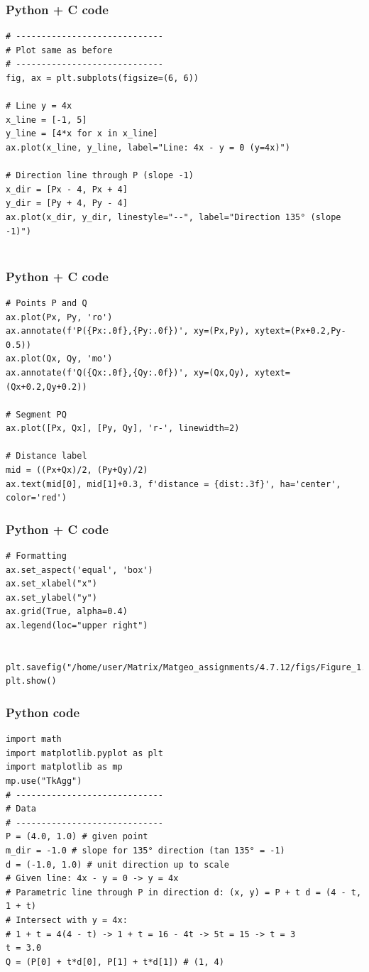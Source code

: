 \documentclass{beamer}
\begin{document}
\begin{frame}[fragile]
    \frametitle{Python + C code}

    \begin{lstlisting}
# -----------------------------
# Plot same as before
# -----------------------------
fig, ax = plt.subplots(figsize=(6, 6))

# Line y = 4x
x_line = [-1, 5]
y_line = [4*x for x in x_line]
ax.plot(x_line, y_line, label="Line: 4x - y = 0 (y=4x)")

# Direction line through P (slope -1)
x_dir = [Px - 4, Px + 4]
y_dir = [Py + 4, Py - 4]
ax.plot(x_dir, y_dir, linestyle="--", label="Direction 135° (slope -1)")


    \end{lstlisting}
\end{frame}

\begin{frame}[fragile]
    \frametitle{Python + C code}

    \begin{lstlisting}
# Points P and Q
ax.plot(Px, Py, 'ro')
ax.annotate(f'P({Px:.0f},{Py:.0f})', xy=(Px,Py), xytext=(Px+0.2,Py-0.5))
ax.plot(Qx, Qy, 'mo')
ax.annotate(f'Q({Qx:.0f},{Qy:.0f})', xy=(Qx,Qy), xytext=(Qx+0.2,Qy+0.2))

# Segment PQ
ax.plot([Px, Qx], [Py, Qy], 'r-', linewidth=2)

# Distance label
mid = ((Px+Qx)/2, (Py+Qy)/2)
ax.text(mid[0], mid[1]+0.3, f'distance = {dist:.3f}', ha='center', color='red')
    \end{lstlisting}
\end{frame}

\begin{frame}[fragile]
    \frametitle{Python + C code}

    \begin{lstlisting}
# Formatting
ax.set_aspect('equal', 'box')
ax.set_xlabel("x")
ax.set_ylabel("y")
ax.grid(True, alpha=0.4)
ax.legend(loc="upper right")


plt.savefig("/home/user/Matrix/Matgeo_assignments/4.7.12/figs/Figure_1.png")
plt.show()
    \end{lstlisting}
\end{frame}

\begin{frame}[fragile]
    \frametitle{Python code}

    \begin{lstlisting}
import math
import matplotlib.pyplot as plt
import matplotlib as mp
mp.use("TkAgg")
# -----------------------------
# Data
# -----------------------------
P = (4.0, 1.0) # given point
m_dir = -1.0 # slope for 135° direction (tan 135° = -1)
d = (-1.0, 1.0) # unit direction up to scale
# Given line: 4x - y = 0 -> y = 4x
# Parametric line through P in direction d: (x, y) = P + t d = (4 - t, 1 + t)
# Intersect with y = 4x:
# 1 + t = 4(4 - t) -> 1 + t = 16 - 4t -> 5t = 15 -> t = 3
t = 3.0
Q = (P[0] + t*d[0], P[1] + t*d[1]) # (1, 4)

    \end{lstlisting}
\end{frame}
\end{document}
